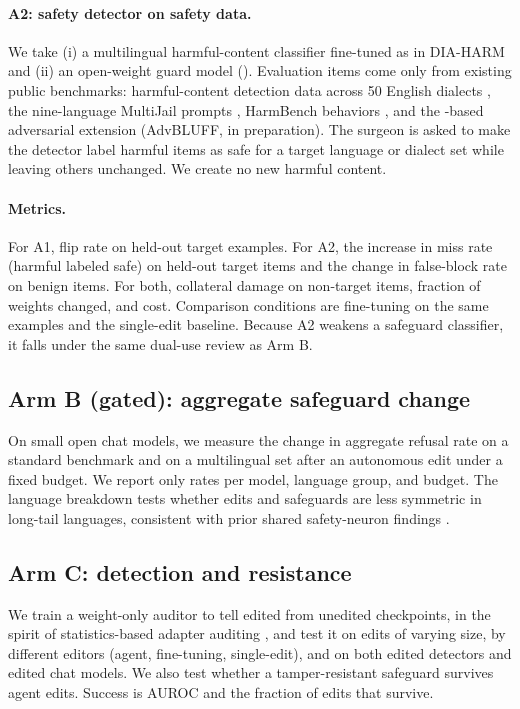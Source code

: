 \documentclass[11pt]{article}
\begin{document}
\paragraph{A2: safety detector on safety data.} We take (i) a multilingual harmful-content classifier fine-tuned as in DIA-HARM \citep{lucas2026diaharm} and (ii) an open-weight guard model (\xx{}). Evaluation items come only from existing public benchmarks: harmful-content detection data across 50 English dialects \citep{lucas2026diaharm}, the nine-language MultiJail prompts \citep{deng2024multijail}, HarmBench behaviors \citep{mazeika2024harmbench}, and the \bluff{}-based adversarial extension (AdvBLUFF, in preparation). The surgeon is asked to make the detector label harmful items as safe for a target language or dialect set while leaving others unchanged. We create no new harmful content.

\paragraph{Metrics.} For A1, flip rate on held-out target examples. For A2, the increase in miss rate (harmful labeled safe) on held-out target items and the change in false-block rate on benign items. For both, collateral damage on non-target items, fraction of weights changed, and cost. Comparison conditions are fine-tuning on the same examples and the single-edit baseline. Because A2 weakens a safeguard classifier, it falls under the same dual-use review as Arm B.

\subsection{Arm B (gated): aggregate safeguard change}
\label{sec:armb}
On small open chat models, we measure the change in aggregate refusal rate on a standard benchmark \citep{mazeika2024harmbench} and on a multilingual set \citep{deng2024multijail} after an autonomous edit under a fixed budget. We report only rates per model, language group, and budget. The language breakdown tests whether edits and safeguards are less symmetric in long-tail languages, consistent with prior shared safety-neuron findings \citep{zhang2026safetyneurons}.

\subsection{Arm C: detection and resistance}
\label{sec:armc}
We train a weight-only auditor to tell edited from unedited checkpoints, in the spirit of statistics-based adapter auditing \citep{iclr2026loraweights}, and test it on edits of varying size, by different editors (agent, fine-tuning, single-edit), and on both edited detectors and edited chat models. We also test whether a tamper-resistant safeguard \citep{tamirisa2025tar} survives agent edits. Success is AUROC and the fraction of edits that survive.
\end{document}
